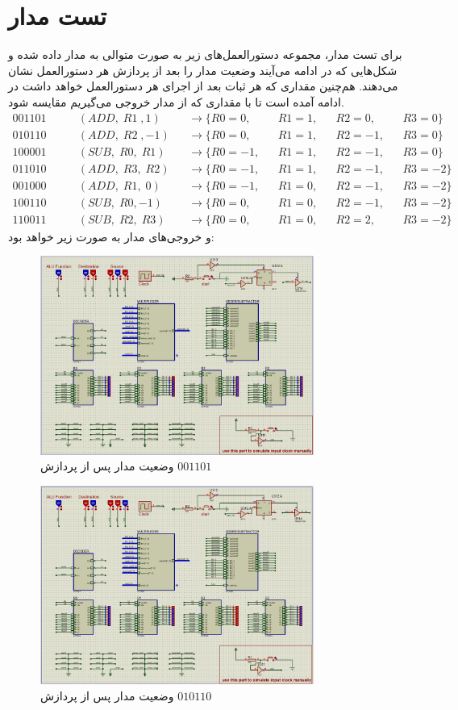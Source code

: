 \documentclass[12pt,onecolumn,a4paper,fleqn]{article}
\begin{document}
	\section{تست مدار}
	برای تست مدار، مجموعه دستورالعمل‌های زیر به صورت متوالی به مدار داده شده و شکل‌هایی که در ادامه می‌آیند وضعیت مدار را بعد از پردازش هر دستورالعمل نشان می‌دهند. هم‌چنین مقداری که هر ثبات بعد از اجرای هر دستورالعمل خواهد داشت در ادامه آمده است تا با مقداری که از مدار خروجی می‌گیریم مقایسه شود.
	\[
	\begin{aligned}
		001101 &\qquad (ADD,\;R1\;,1)	&&\to \{R0=0,&&R1=1,&&R2=0,&&R3=0\}\\
		010110 &\qquad (ADD,\;R2\;,-1)	&&\to \{R0=0,&&R1=1,&&R2=-1,&&R3=0\}\\
		100001 &\qquad (SUB,\;R0,\;R1)	&&\to \{R0=-1,&&R1=1,&&R2=-1,&&R3=0\}\\
		011010 &\qquad (ADD,\;R3,\;R2)	&&\to \{R0=-1,&&R1=1,&&R2=-1,&&R3=-2\}\\
		001000 &\qquad (ADD,\;R1,\;0)	&&\to \{R0=-1,&&R1=0,&&R2=-1,&&R3=-2\}\\
		100110 &\qquad (SUB,\;R0,-1)	&&\to \{R0=0,&&R1=0,&&R2=-1,&&R3=-2\}\\
		110011 &\qquad (SUB,\;R2,\;R3)	&&\to \{R0=0,&&R1=0,&&R2=2,&&R3=-2\}
	\end{aligned}
	\]
	و خروجی‌های مدار به صورت زیر خواهد بود:
	\begin{figure}[H]
		\centering
		\includegraphics[width=0.8\textwidth]{source/inst1.png}
		\caption{‌وضعیت مدار پس از پردازش
			$001101$}
	\end{figure}
	\begin{figure}[H]
		\centering
		\includegraphics[width=0.8\textwidth]{source/inst2.png}
		\caption{‌وضعیت مدار پس از پردازش
			$010110$}
	\end{figure}
\end{document}
